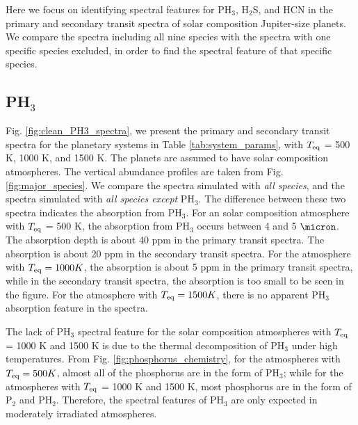 \documentclass[twocolumn]{aastex61}
\begin{document}
Here we focus on identifying spectral features for PH$_3$, H$_2$S, and HCN in the primary and secondary transit spectra of solar composition Jupiter-size planets. We compare the spectra including all nine species with the spectra with one specific species excluded, in order to find the spectral feature of that specific species. 

\subsection{PH$_3$}\label{subsec:clean_PH$_3$}
Fig. \ref{fig:clean_PH3_spectra}, we present the primary and secondary transit spectra for the planetary systems in Table \ref{tab:system_params}, with $T_{\rm eq}$ = 500 K, 1000 K, and 1500 K. The planets are assumed to have solar composition atmospheres. The vertical abundance profiles are taken from Fig. \ref{fig:major_species}. We compare the spectra simulated with \textit{all species}, and the spectra simulated with \textit{all species except} PH$_3$. The difference between these two spectra indicates the absorption from PH$_3$. For an solar composition atmosphere with $T_{\rm eq}$ = 500 K, the absorption from PH$_3$ occurs between 4 and 5 $\micron$. The absorption depth is about 40 ppm in the primary transit spectra. The absorption is about 20 ppm in the secondary transit spectra. For the atmosphere with $T_{\rm eq} = 1000 K$, the absorption is about 5 ppm in the primary transit spectra, while in the secondary transit spectra, the absorption is too small to be seen in the figure. For the atmosphere with $T_{\rm eq} = 1500 K$, there is no apparent PH$_3$ absorption feature in the spectra.

The lack of PH$_3$ spectral feature for the solar composition atmospheres with $T_{\rm eq}$ = 1000 K and 1500 K is due to the thermal decomposition of PH$_3$ under high temperatures. From Fig. \ref{fig:phosphorus_chemistry}, for the atmospheres with $T_{\rm eq} = 500 K$, almost all of the phosphorus are in the form of PH$_3$; while for the atmospheres with $T_{\rm eq}$ = 1000 K and 1500 K, most phosphorus are in the form of P$_2$ and PH$_2$. Therefore, the spectral features of PH$_3$ are only expected in moderately irradiated atmospheres.    
\end{document}
